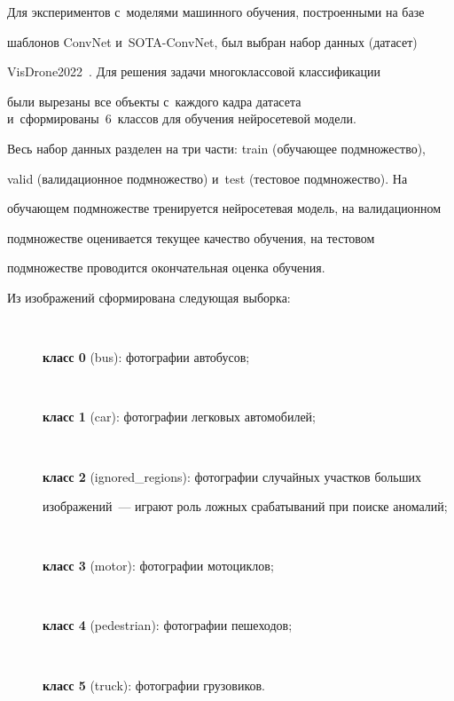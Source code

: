   Для экспериментов с~моделями машинного обучения, построенными на базе 


шаблонов ConvNet и~SOTA-ConvNet, был выбран набор данных (датасет) 


VisDrone2022~\cite{16-ar}. Для решения задачи многоклассовой классификации 


были вырезаны все объекты с~каждого кадра датасета и~сформированы~6~классов для обуче\-ния нейросетевой модели.


  


  Весь набор данных разделен на три части: train (обучающее подмножество), 


valid (валидационное подмножество) и~test (тестовое подмножество). На 


обучающем подмножестве тренируется нейросетевая модель, на валидационном 


подмножестве оценивается текущее качество обучения, на тестовом 


подмножестве проводится окончательная оценка обуче\-ния.


  


  Из изображений сформирована следующая выборка:


  \begin{description}


  \item[\,] \textbf{класс 0} (bus): фотографии автобусов;


  \item[\,] \textbf{класс 1} (car): фотографии легковых автомобилей;


  \item[\,] \textbf{класс 2} (ignored\_regions): фотографии случайных участков больших 


изображений~--- играют роль ложных срабатываний при поиске аномалий;


  \item[\,] \textbf{класс 3} (motor): фотографии мотоциклов;


  \item[\,] \textbf{класс 4} (pedestrian): фотографии пешеходов;


  \item[\,] \textbf{класс 5} (truck): фотографии грузовиков.


  \end{description}


  


